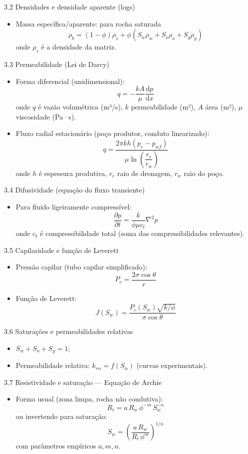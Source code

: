 \documentclass[11pt,a4paper]{article}
\begin{document}
3.2 Densidades e densidade aparente (logs)
\begin{itemize}
\item Massa específica/aparente: para rocha saturada
$$\rho_b=(1-\phi)\rho_{s}+\phi(S_w\rho_w+S_o\rho_o+S_g\rho_g)$$
onde $\rho_s$ é a densidade da matriz.
\end{itemize}

3.3 Permeabilidade (Lei de Darcy)
\begin{itemize}
\item Forma diferencial (unidimensional):
$$q=-\dfrac{kA}{\mu}\dfrac{\mathrm{d}p}{\mathrm{d}x}$$
onde $q$ é vazão volumétrica (m³/s), $k$ permeabilidade (m²), $A$ área (m²), $\mu$ viscosidade (Pa·s).
\item Fluxo radial estacionário (poço produtor, conduto linearizado):
$$q=\dfrac{2\pi k h (p_e-p_{wf})}{\mu\ln\left(\dfrac{r_e}{r_w}\right)}$$
onde $h$ é espessura produtiva, $r_e$ raio de drenagem, $r_w$ raio do poço.
\end{itemize}

3.4 Difusividade (equação do fluxo transiente)
\begin{itemize}
\item Para fluido ligeiramente compressível:
$$\dfrac{\partial p}{\partial t}=\dfrac{k}{\phi\mu c_t}\nabla^2 p$$
onde $c_t$ é compressibilidade total (soma das compressibilidades relevantes).
\end{itemize}

3.5 Capilaridade e função de Leverett
\begin{itemize}
\item Pressão capilar (tubo capilar simplificado):
$$P_c = \dfrac{2\sigma\cos\theta}{r}$$
\item Função de Leverett:
$$J(S_w)=\dfrac{P_c(S_w)\sqrt{k/\phi}}{\sigma\cos\theta}$$
\end{itemize}

3.6 Saturações e permeabilidades relativas
\begin{itemize}
\item $S_w+S_o+S_g=1$;
\item Permeabilidade relativa: $k_{r\alpha}=f(S_\alpha)$ (curvas experimentais).
\end{itemize}

3.7 Resistividade e saturação — Equação de Archie
\begin{itemize}
\item Forma usual (zona limpa, rocha não condutiva):
$$R_t = a\,R_w\,\phi^{-m}\,S_w^{-n}$$
ou invertendo para saturação:
$$S_w = \left(\dfrac{a\,R_w}{R_t\,\phi^{m}}\right)^{1/n}$$
com parâmetros empíricos $a,m,n$.
\end{itemize}
\end{document}

